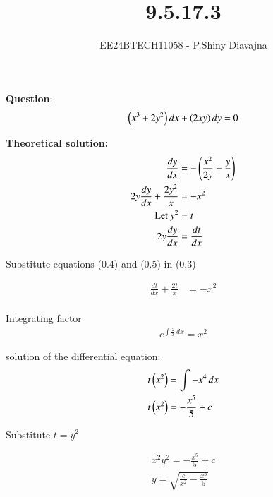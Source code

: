 \documentclass[journal]{IEEEtran}
\begin{document}

\vspace{3cm}

\title{9.5.17.3}
\author{EE24BTECH11058 - P.Shiny Diavajna}
{\let\newpage\relax\maketitle}

\renewcommand{\thefigure}{\theenumi}
\renewcommand{\thetable}{\theenumi}
\setlength{\intextsep}{10pt} %


\renewcommand{\thetable}{\theenumi}


\textbf{Question}: 
\begin{align}
 \left(x^3+2{y^2}\right) dx + \left(2xy\right)dy =0
\end{align}

\textbf{Theoretical solution:}
 \begin{align}
\frac{dy}{dx} &= -\left(\frac{x^2}{2y}+\frac{y}{x}\right)\\
2y\frac{dy}{dx}+\frac{2y^2}{x}&=-x^2\\
\text{Let } y^2 &= t \\
2y\frac{dy}{dx} &= \frac{dt}{dx} 
\end{align}

Substitute equations (0.4) and (0.5) in (0.3)

\begin{align}
    \frac{dt}{dx} +\frac{2t}{x}&= -x^2\\
\end{align}

Integrating factor 
\begin{align}
    e^{\int \frac{2}{x} \, dx}=x^2
\end{align}

solution of the differential equation:
\begin{align}
    t\left(x^2\right)&=\int -x^4 \, dx\\
    t\left(x^2\right)&=-\frac{x^5}{5}+c
\end{align}

Substitute $t=y^2$

\begin{align}
     x^2y^2 = -\frac{x^5}{5}+c\\
     y=\sqrt{\frac{c}{x^2}-\frac{x^3}{5}}
\end{align}
\end{document}
